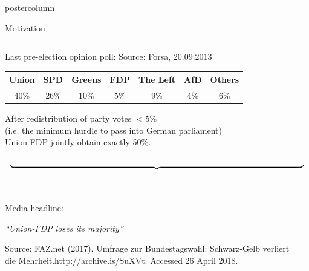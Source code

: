 \documentclass[final,hyperref={pdfpagelabels=false}]{beamer}
\newcommand{\darkgray}[1]{\textcolor{koaladarkgray}{#1}}
\newcommand{\lightgray}[1]{\textcolor{koalagray}{#1}}
\begin{document}
\begin{frame}
\begin{columns}
\begin{column}{1\textwidth}
\begin{beamercolorbox}[center,wd=\textwidth]{postercolumn}
\begin{minipage}[T]{.95\textwidth}
\begin{block}{\footnotesize Motivation}
{{\begin{minipage}{0.94\textwidth}
\begin{columns}[t]
  \begin{column}{.29\textwidth}
  \darkgray{Last pre-election opinion poll:} \lightgray{\tiny Source: Forsa, 20.09.2013}
  \\[2.5ex]
  \begin{center}\centering
  \begin{tabular}{ccccccc}
  \toprule
  \darkgray{Union} & {\footnotesize \lightgray{SPD}} & {\footnotesize \lightgray{Greens}} & \darkgray{FDP} & {\footnotesize \lightgray{The Left}} & {\footnotesize \lightgray{AfD}} & {\footnotesize \lightgray{Others}} \\ \midrule
  \darkgray{40\%} & {\footnotesize \lightgray{26\%}} & {\footnotesize \lightgray{10\%}} & \darkgray{5\%} & {\footnotesize \lightgray{9\%}} & {\footnotesize \lightgray{4\%}} & {\footnotesize \lightgray{6\%}} \\
  \bottomrule
  \end{tabular}
  \end{center}
  \vspace{1.5ex}
  \begin{center}\centering
  \darkgray{After redistribution} \lightgray{\footnotesize of party votes $<$5\% \\ (i.e. the minimum hurdle to pass into German parliament)} \\
  \darkgray{Union-FDP} \lightgray{\footnotesize jointly} \darkgray{obtain} \lightgray{\footnotesize exactly} \darkgray{50\%}.
  \end{center}
  \vspace{-3ex}
  \textcolor{koalablue}{$$ \underbrace{\resizebox{\hsize}{!}{ }}_{ } $$}
  \ \\ \vspace{-2ex}
  \begin{mdleftred}
  \begin{minipage}{\textwidth}
  \lightgray{\footnotesize Media headline:}
  \\
  \begin{center}\centering
  \vspace{-2ex}
  \darkgray{\textit{``Union-FDP loses its majority''}}
  \vspace{-.2ex}
  \end{center}
  \lightgray{\tiny Source: FAZ.net (2017). Umfrage zur Bundestagswahl: Schwarz-Gelb verliert \\[-2ex]
  die Mehrheit.http://archive.is/SuXVt. Accessed 26 April 2018.}
  \end{minipage}
  \end{mdleftred}
  \end{column}


\end{columns}
\end{minipage}}}
\end{block}
\end{minipage}
\end{beamercolorbox}
\end{column}
\end{columns}
\end{frame}
\end{document}
